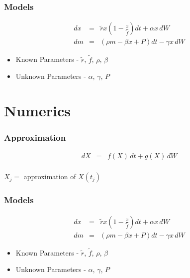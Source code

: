 \documentclass{beamer}   %
\newcommand{\lp}{\left(}
\newcommand{\rp}{\right)}
\begin{document}
\begin{frame}
  \frametitle{Models}
  \begin{eqnarray}
    dx &=& \tilde{r} x \lp 1- \frac{x}{\tilde{f}}\rp dt +\alpha x \, dW \\
    dm &=& ( \rho m - \beta x + P) dt - \gamma x \, dW
  \end{eqnarray}
  \begin{itemize}
  \item Known Parameters - $\tilde{r}$, $\tilde{f}$, $\rho$, $\beta$
  \item Unknown Parameters - $\alpha$, $\gamma$, $P$
  \end{itemize}
\end{frame}

\section{Numerics}

\begin{frame}
  \frametitle{Approximation}
  \vspace*{-3em}
  \begin{eqnarray*}
    dX &=& f(X) \, dt + g(X) \, dW \\
  \end{eqnarray*}
  \vspace*{-3em}
  \begin{center}
    $X_{j} =$ approximation of $X(t_{j})$ \\ [20pt]
  \end{center}

\end{frame}



\begin{frame}
  \frametitle{Models}
  \begin{eqnarray*}
    dx &=& \tilde{r} x \lp 1- \frac{x}{\tilde{f}}\rp dt +\alpha x \, dW \\
    dm &=& ( \rho m - \beta x + P) dt - \gamma x \, dW
  \end{eqnarray*}
  \begin{itemize}
  \item Known Parameters - $\tilde{r}$, $\tilde{f}$, $\rho$, $\beta$
  \item Unknown Parameters - $\alpha$, $\gamma$, $P$
  \end{itemize}
\end{frame}
\end{document}
